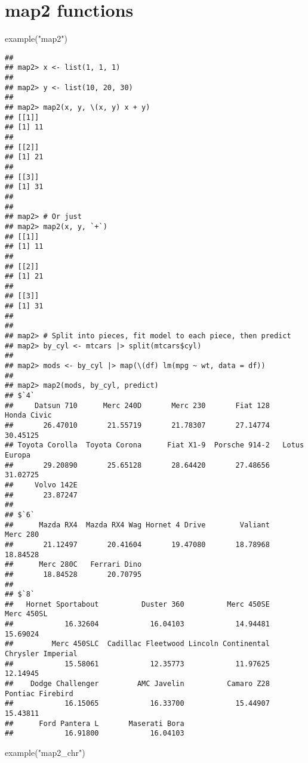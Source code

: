 \documentclass[
]{book}
\newenvironment{Shaded}{\begin{snugshade}}{\end{snugshade}}
\newcommand{\FunctionTok}[1]{\textcolor[rgb]{0.00,0.00,0.00}{#1}}
\newcommand{\NormalTok}[1]{#1}
\newcommand{\StringTok}[1]{\textcolor[rgb]{0.31,0.60,0.02}{#1}}
\begin{document}
\hypertarget{map2-functions}{%
\section{map2 functions}\label{map2-functions}}

\begin{Shaded}
\begin{Highlighting}[]
\FunctionTok{example}\NormalTok{(}\StringTok{"map2"}\NormalTok{)}
\end{Highlighting}
\end{Shaded}

\begin{verbatim}
## 
## map2> x <- list(1, 1, 1)
## 
## map2> y <- list(10, 20, 30)
## 
## map2> map2(x, y, \(x, y) x + y)
## [[1]]
## [1] 11
## 
## [[2]]
## [1] 21
## 
## [[3]]
## [1] 31
## 
## 
## map2> # Or just
## map2> map2(x, y, `+`)
## [[1]]
## [1] 11
## 
## [[2]]
## [1] 21
## 
## [[3]]
## [1] 31
## 
## 
## map2> # Split into pieces, fit model to each piece, then predict
## map2> by_cyl <- mtcars |> split(mtcars$cyl)
## 
## map2> mods <- by_cyl |> map(\(df) lm(mpg ~ wt, data = df))
## 
## map2> map2(mods, by_cyl, predict)
## $`4`
##     Datsun 710      Merc 240D       Merc 230       Fiat 128    Honda Civic 
##       26.47010       21.55719       21.78307       27.14774       30.45125 
## Toyota Corolla  Toyota Corona      Fiat X1-9  Porsche 914-2   Lotus Europa 
##       29.20890       25.65128       28.64420       27.48656       31.02725 
##     Volvo 142E 
##       23.87247 
## 
## $`6`
##      Mazda RX4  Mazda RX4 Wag Hornet 4 Drive        Valiant       Merc 280 
##       21.12497       20.41604       19.47080       18.78968       18.84528 
##      Merc 280C   Ferrari Dino 
##       18.84528       20.70795 
## 
## $`8`
##   Hornet Sportabout          Duster 360          Merc 450SE          Merc 450SL 
##            16.32604            16.04103            14.94481            15.69024 
##         Merc 450SLC  Cadillac Fleetwood Lincoln Continental   Chrysler Imperial 
##            15.58061            12.35773            11.97625            12.14945 
##    Dodge Challenger         AMC Javelin          Camaro Z28    Pontiac Firebird 
##            16.15065            16.33700            15.44907            15.43811 
##      Ford Pantera L       Maserati Bora 
##            16.91800            16.04103
\end{verbatim}

\begin{Shaded}
\begin{Highlighting}[]
\FunctionTok{example}\NormalTok{(}\StringTok{"map2\_chr"}\NormalTok{)}
\end{Highlighting}
\end{Shaded}
\end{document}
